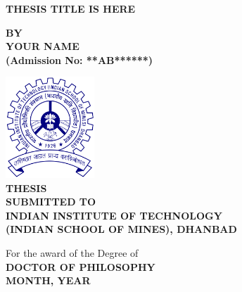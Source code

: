 \begin{titlepage}
    \begin{center}
        {\fontsize{22}{83}\selectfont
     
        \textbf{THESIS TITLE IS HERE}}

        \vspace{0.8cm} %
        \textbf{BY} \\[0.2cm]
        {\fontsize{18}{20}\selectfont 
        \textbf{YOUR NAME} \\[0.1cm] %
        \textbf{(Admission No: **AB******)}
        }
        
        \vspace{0.8cm} %

        \includegraphics[width=0.25\textwidth]{Logos/IITISM_Logo.png}\\[0.4cm] %
        
        {\fontsize{14}{16}\selectfont %
        \textbf{THESIS} \\[0.1cm]
        \textbf{SUBMITTED TO} \\[0.1cm]
        \textbf{INDIAN INSTITUTE OF TECHNOLOGY} \\[0.1cm]
        \textbf{(INDIAN SCHOOL OF MINES), DHANBAD} 
        }

        \vspace{0.5cm} %

        \normalfont For the award of the Degree of \\[0.2cm]
        \textbf{DOCTOR OF PHILOSOPHY} \\[0.2cm]
        
        \textbf{MONTH, YEAR}
        
    \end{center}
\end{titlepage}
